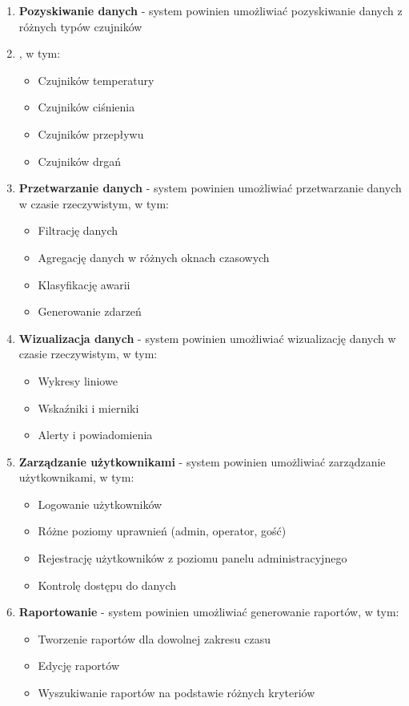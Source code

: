 \begin{enumerate}
    \item \textbf{Pozyskiwanie danych} - system powinien umożliwiać pozyskiwanie danych z różnych typów czujników
   \item , w tym:
   \begin{itemize}
       \item Czujników temperatury
       \item Czujników ciśnienia
       \item Czujników przepływu
       \item Czujników drgań
   \end{itemize}
    
    \item \textbf{Przetwarzanie danych} - system powinien umożliwiać przetwarzanie danych w czasie rzeczywistym, w tym:
    \begin{itemize}
        \item Filtrację danych
        \item Agregację danych w różnych oknach czasowych
        \item Klasyfikację awarii
        \item Generowanie zdarzeń
    \end{itemize}
    
    \item \textbf{Wizualizacja danych} - system powinien umożliwiać wizualizację danych w czasie rzeczywistym, w tym:
    \begin{itemize}
        \item Wykresy liniowe
        \item Wskaźniki i mierniki
        \item Alerty i powiadomienia
    \end{itemize}
    
   \item \textbf{Zarządzanie użytkownikami} - system powinien umożliwiać zarządzanie użytkownikami, w tym:
   \begin{itemize}
       \item Logowanie użytkowników
       \item Różne poziomy uprawnień (admin, operator, gość)
       \item Rejestrację użytkowników z poziomu panelu administracyjnego
       \item Kontrolę dostępu do danych
   \end{itemize}
    
    \item \textbf{Raportowanie} - system powinien umożliwiać generowanie raportów, w tym:
   \begin{itemize}
       \item Tworzenie raportów dla dowolnej zakresu czasu
       \item Edycję raportów
       \item Wyszukiwanie raportów na podstawie różnych kryteriów
   \end{itemize}
\end{enumerate}

